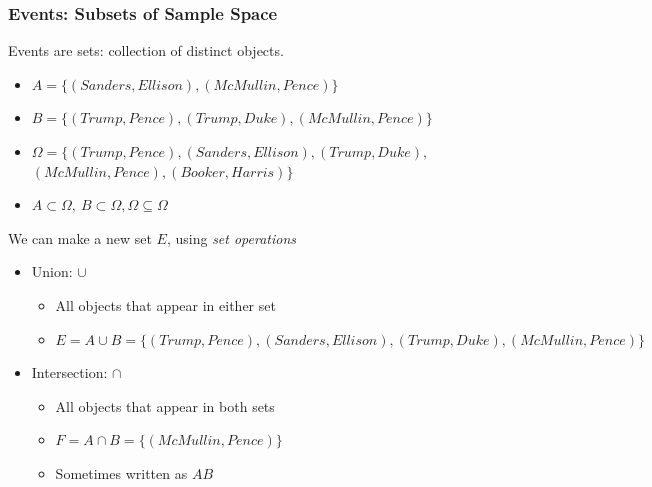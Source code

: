 \documentclass[handout]{beamer}
\numberwithin{equation}{section}
\begin{document}
\begin{frame}
\frametitle{Events: Subsets of Sample Space}

Events are \alert{sets}: collection of distinct objects.  \\
\begin{itemize}

\item[] $A = \{(Sanders, Ellison), (McMullin, Pence)\}$  \pause
\item[] $B  = \{ (Trump, Pence), (Trump, Duke), (McMullin, Pence)\} $ \pause
\item[] $\Omega = \{ (Trump, Pence), (Sanders, Ellison), (Trump, Duke),$\\ $(McMullin, Pence), (Booker, Harris) \}$\pause
\item[] $A\subset \Omega,\ B\subset \Omega, \Omega \subseteq \Omega$ \pause
\end{itemize}
We can make a new set $E$, using \emph{set operations} \pause
\begin{itemize}
\item[1)] Union: $\cup$  \pause
\begin{itemize}
\item[-] All objects that appear in \alert{either} set  \pause
\item[-] $E = A\cup B  = \{(Trump, Pence), (Sanders, Ellison), (Trump, Duke), (McMullin, Pence)\} $ \pause
\end{itemize}
\item[2)] Intersection: $\cap$  \pause
\begin{itemize}
\item[-] All objects that appear in \alert{both} sets  \pause
\item[-] $F= A\cap B = \{(McMullin, Pence)\} $ \pause
\item[-] Sometimes written as $AB$ \pause
\end{itemize}
\end{itemize}

\end{frame}
\end{document}
